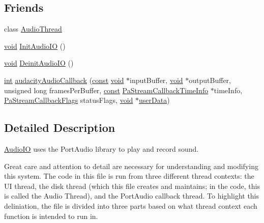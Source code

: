 \subsection*{Friends}
\begin{DoxyCompactItemize}
\item 
class \hyperlink{class_audio_i_o_a894b7c943c91bb34f845aeb117786dff}{Audio\+Thread}
\item 
\hyperlink{sound_8c_ae35f5844602719cf66324f4de2a658b3}{void} \hyperlink{class_audio_i_o_a5c082d9ef3612f42a4a78edffdf2a0db}{Init\+Audio\+IO} ()
\item 
\hyperlink{sound_8c_ae35f5844602719cf66324f4de2a658b3}{void} \hyperlink{class_audio_i_o_a362633315924afe19ab0fe0cf4bd32da}{Deinit\+Audio\+IO} ()
\item 
\hyperlink{xmltok_8h_a5a0d4a5641ce434f1d23533f2b2e6653}{int} \hyperlink{class_audio_i_o_a0d694f00df707ad21d421a1b29ad46ea}{audacity\+Audio\+Callback} (\hyperlink{getopt1_8c_a2c212835823e3c54a8ab6d95c652660e}{const} \hyperlink{sound_8c_ae35f5844602719cf66324f4de2a658b3}{void} $\ast$input\+Buffer, \hyperlink{sound_8c_ae35f5844602719cf66324f4de2a658b3}{void} $\ast$output\+Buffer, unsigned long frames\+Per\+Buffer, \hyperlink{getopt1_8c_a2c212835823e3c54a8ab6d95c652660e}{const} \hyperlink{struct_pa_stream_callback_time_info}{Pa\+Stream\+Callback\+Time\+Info} $\ast$time\+Info, \hyperlink{portaudio_8h_a55a005924bcfa0424594f4f65cd4ae82}{Pa\+Stream\+Callback\+Flags} status\+Flags, \hyperlink{sound_8c_ae35f5844602719cf66324f4de2a658b3}{void} $\ast$\hyperlink{xmlparse_8c_a4b666535c828e23ccd16510a0a1a1943}{user\+Data})
\end{DoxyCompactItemize}


\subsection{Detailed Description}
\hyperlink{class_audio_i_o}{Audio\+IO} uses the Port\+Audio library to play and record sound. 

Great care and attention to detail are necessary for understanding and modifying this system. The code in this file is run from three different thread contexts\+: the UI thread, the disk thread (which this file creates and maintains; in the code, this is called the Audio Thread), and the Port\+Audio callback thread. To highlight this deliniation, the file is divided into three parts based on what thread context each function is intended to run in.


